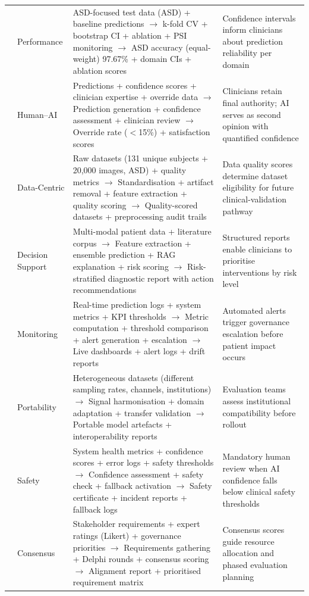 \begin{table}[!htbp]
\begin{tabularx}{\textwidth}{@{} p{0.4cm} p{1.5cm} L L @{}}
 & Performance & ASD-focused test data (ASD) + baseline predictions $\to$ k-fold CV + bootstrap CI + ablation + PSI monitoring $\to$ ASD accuracy (equal-weight) 97.67\% + domain CIs + ablation scores & Confidence intervals inform clinicians about prediction reliability per domain \\
 & Human--AI & Predictions + confidence scores + clinician expertise + override data $\to$ Prediction generation + confidence assessment + clinician review $\to$ Override rate ($<$15\%) + satisfaction scores & Clinicians retain final authority; AI serves as second opinion with quantified confidence \\
 & Data-Centric & Raw datasets (131 unique subjects + 20{,}000 images, ASD) + quality metrics $\to$ Standardisation + artifact removal + feature extraction + quality scoring $\to$ Quality-scored datasets + preprocessing audit trails & Data quality scores determine dataset eligibility for future clinical-validation pathway \\
 & Decision Support & Multi-modal patient data + literature corpus $\to$ Feature extraction + ensemble prediction + RAG explanation + risk scoring $\to$ Risk-stratified diagnostic report with action recommendations & Structured reports enable clinicians to prioritise interventions by risk level \\
 & Monitoring & Real-time prediction logs + system metrics + KPI thresholds $\to$ Metric computation + threshold comparison + alert generation + escalation $\to$ Live dashboards + alert logs + drift reports & Automated alerts trigger governance escalation before patient impact occurs \\
 & Portability & Heterogeneous datasets (different sampling rates, channels, institutions) $\to$ Signal harmonisation + domain adaptation + transfer validation $\to$ Portable model artefacts + interoperability reports & Evaluation teams assess institutional compatibility before rollout \\
 & Safety & System health metrics + confidence scores + error logs + safety thresholds $\to$ Confidence assessment + safety check + fallback activation $\to$ Safety certificate + incident reports + fallback logs & Mandatory human review when AI confidence falls below clinical safety thresholds \\
 & Consensus & Stakeholder requirements + expert ratings (Likert) + governance priorities $\to$ Requirements gathering + Delphi rounds + consensus scoring $\to$ Alignment report + prioritised requirement matrix & Consensus scores guide resource allocation and phased evaluation planning \\

\end{tabularx}
\end{table}
